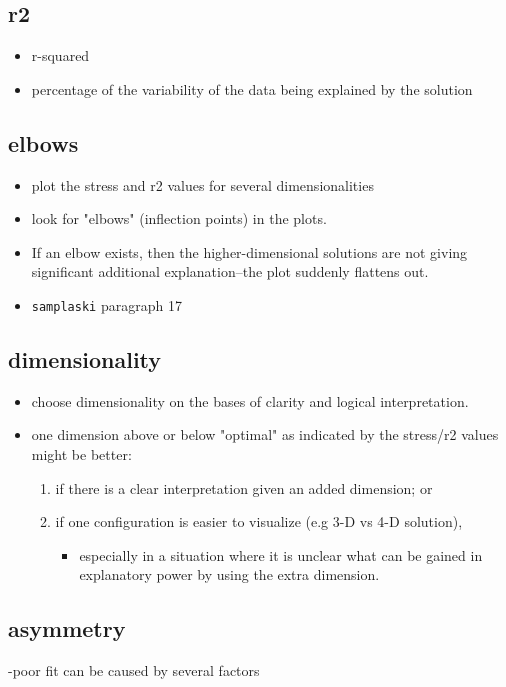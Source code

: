 \documentclass[11pt]{article}
\begin{document}
{{\subsection{r2}
\label{sec-22-4}
\begin{itemize}
\item r-squared
\item percentage of the variability of the data being explained by the
solution
\end{itemize}

\subsection{elbows}
\label{sec-22-5}
\begin{itemize}
\item plot the stress and r2 values for several dimensionalities
\item look for "elbows" (inflection points) in the plots.
\item If an elbow exists, then the higher-dimensional solutions are
not giving significant additional explanation--the plot suddenly
flattens out.
\item \texttt{samplaski} paragraph 17
\end{itemize}

\subsection{dimensionality}
\label{sec-22-6}
\begin{itemize}
\item choose dimensionality on the bases of clarity and logical
interpretation.
\item one dimension above or below "optimal" as indicated by the
stress/r2 values might be better:
\begin{enumerate}
\item if there is a clear interpretation given an added dimension; or
\item if one configuration is easier to visualize (e.g 3-D vs 4-D
solution),
\begin{itemize}
\item especially in a situation where it is unclear what can be
gained in explanatory power by using the extra dimension.
\end{itemize}
\end{enumerate}
\end{itemize}

\subsection{asymmetry}
\label{sec-22-7}
-poor fit can be caused by several factors

}}
\end{document}
